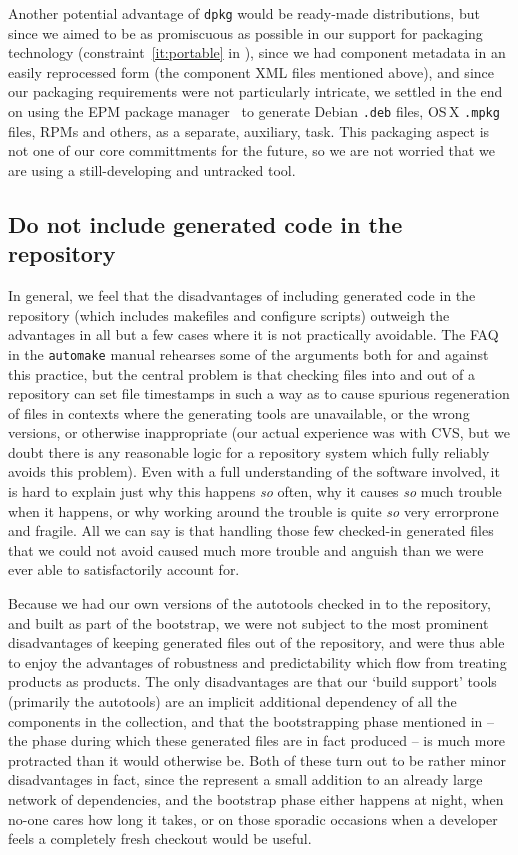 \documentclass{speauth}
\begin{document}
Another potential advantage of \texttt{dpkg} would be ready-made
distributions, but since we aimed to be as promiscuous as possible in
our support for packaging technology (constraint~\ref{it:portable} in
), since we had component metadata in an
easily reprocessed form (the component XML files mentioned above), and
since our packaging requirements were not particularly intricate, we
settled in the end on using the EPM package manager~\cite{epm} to
generate Debian \texttt{.deb} files, OS\,X \texttt{.mpkg} files, RPMs
and others, as a separate, auxiliary, task.  This packaging aspect is
not one of our core committments for the future, so we are not worried
that we are using a still-developing and untracked tool.

\subsection{Do not include generated code in the repository}
\label{s:generated}

In general, we feel that the disadvantages of including generated code
in the repository (which includes makefiles and configure scripts)
outweigh the advantages in all but a few cases where it is not
practically avoidable.  The FAQ in the \texttt{automake} manual
rehearses some of the arguments both for and against this practice,
but the central problem is that checking files into and out of a
repository can set file timestamps in such a way as to cause spurious
regeneration of files in contexts where the generating tools are
unavailable, or the wrong versions, or otherwise inappropriate (our
actual experience was with CVS, but we doubt there is any reasonable
logic for a repository system which fully reliably avoids this problem).  Even
with a full understanding of the software involved, it is hard to
explain just why this happens \emph{so} often, why it causes \emph{so}
much trouble when it happens, or why working around the trouble is
quite \emph{so} very errorprone and fragile.  All we can say is that handling
those few checked-in generated files that we could not avoid caused
much more trouble and anguish than we were ever able to satisfactorily
account for.

Because we had our own versions of the autotools checked in to the
repository, and built as part of the bootstrap, we were not subject
to the most prominent disadvantages of keeping generated files out of
the repository, and were thus able to enjoy the advantages of
robustness and predictability which flow from treating products as
products.  The only disadvantages are that our `build support' tools
(primarily the autotools) are an implicit additional dependency of all
the components in the collection, and that the bootstrapping phase
mentioned in  -- the phase during which these
generated files are in fact produced -- is much more protracted than
it would otherwise be.  Both of these turn out to be rather minor
disadvantages in fact, since the represent a small addition to an
already large network of dependencies, and the bootstrap phase either
happens at night, when no-one cares how long it takes, or on those
sporadic occasions when a developer feels a completely fresh checkout
would be useful.
\end{document}
